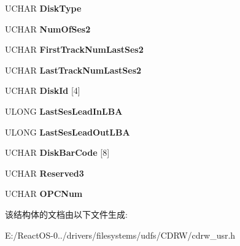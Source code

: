 \begin{DoxyCompactItemize}
\begin{tabbing}
\end{tabbing}\item 
\mbox{\label{struct___d_i_s_c___i_n_f_o___b_l_o_c_k___u_s_e_r___o_u_t_a0e24db75cc0fa976d23ded6efbbfee39}} 
U\+C\+H\+AR {\bfseries Disk\+Type}
\item 
\mbox{\label{struct___d_i_s_c___i_n_f_o___b_l_o_c_k___u_s_e_r___o_u_t_a5c94b1207b1bfd92cc424192b87a04c3}} 
U\+C\+H\+AR {\bfseries Num\+Of\+Ses2}
\item 
\mbox{\label{struct___d_i_s_c___i_n_f_o___b_l_o_c_k___u_s_e_r___o_u_t_a19b21cce94d41a7450f8cd6ffc102ca1}} 
U\+C\+H\+AR {\bfseries First\+Track\+Num\+Last\+Ses2}
\item 
\mbox{\label{struct___d_i_s_c___i_n_f_o___b_l_o_c_k___u_s_e_r___o_u_t_a7a149fd080eb62a0d8e9f5a3aaf29156}} 
U\+C\+H\+AR {\bfseries Last\+Track\+Num\+Last\+Ses2}
\item 
\mbox{\label{struct___d_i_s_c___i_n_f_o___b_l_o_c_k___u_s_e_r___o_u_t_a7daca3260506d6ebaf6bdcfb7553b066}} 
U\+C\+H\+AR {\bfseries Disk\+Id} \mbox{[}4\mbox{]}
\item 
\mbox{\label{struct___d_i_s_c___i_n_f_o___b_l_o_c_k___u_s_e_r___o_u_t_a535713a60a91e7de1fae887bb79d2431}} 
U\+L\+O\+NG {\bfseries Last\+Ses\+Lead\+In\+L\+BA}
\item 
\mbox{\label{struct___d_i_s_c___i_n_f_o___b_l_o_c_k___u_s_e_r___o_u_t_a7936fbaf0509e0f6ebddc58a07072c78}} 
U\+L\+O\+NG {\bfseries Last\+Ses\+Lead\+Out\+L\+BA}
\item 
\mbox{\label{struct___d_i_s_c___i_n_f_o___b_l_o_c_k___u_s_e_r___o_u_t_aca878e1d970cf48f69910e0e52327a53}} 
U\+C\+H\+AR {\bfseries Disk\+Bar\+Code} \mbox{[}8\mbox{]}
\item 
\mbox{\label{struct___d_i_s_c___i_n_f_o___b_l_o_c_k___u_s_e_r___o_u_t_ab47dbc0ece06a41108d0cb416ae1e746}} 
U\+C\+H\+AR {\bfseries Reserved3}
\item 
\mbox{\label{struct___d_i_s_c___i_n_f_o___b_l_o_c_k___u_s_e_r___o_u_t_a3201eb41d0001db88b464a8683219b41}} 
U\+C\+H\+AR {\bfseries O\+P\+C\+Num}
\end{DoxyCompactItemize}


该结构体的文档由以下文件生成\+:\begin{DoxyCompactItemize}
\item 
E\+:/\+React\+O\+S-\/0../drivers/filesystems/udfs/\+C\+D\+R\+W/cdrw\+\_\+usr.\+h\end{DoxyCompactItemize}
